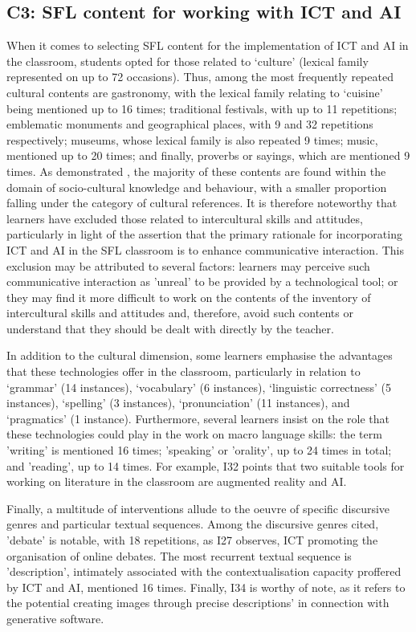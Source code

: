 \documentclass[english]{textolivre}
\begin{document}
\subsection{C3: SFL content for working with ICT and AI}
When it comes to selecting SFL content for the implementation of ICT and AI in the classroom, students opted for those related to ‘culture’ (lexical family represented on up to 72 occasions). Thus, among the most frequently repeated cultural contents are gastronomy, with the lexical family relating to ‘cuisine’ being mentioned up to 16 times; traditional festivals, with up to 11 repetitions; emblematic monuments and geographical places, with 9 and 32 repetitions respectively; museums, whose lexical family is also repeated 9 times; music, mentioned up to 20 times; and finally, proverbs or sayings, which are mentioned 9 times. As demonstrated \cite{cervantes2006}, the majority of these contents are found within the domain of socio-cultural knowledge and behaviour, with a smaller proportion falling under the category of cultural references. It is therefore noteworthy that learners have excluded those related to intercultural skills and attitudes, particularly in light of the assertion that the primary rationale for incorporating ICT and AI in the SFL classroom is to enhance communicative interaction. This exclusion may be attributed to several factors: learners may perceive such communicative interaction as 'unreal' to be provided by a technological tool; or they may find it more difficult to work on the contents of the inventory of intercultural skills and attitudes and, therefore, avoid such contents or understand that they should be dealt with directly by the teacher.

In addition to the cultural dimension, some learners emphasise the advantages that these technologies offer in the classroom, particularly in relation to ‘grammar’ (14 instances), ‘vocabulary’ (6 instances), ‘linguistic correctness’ (5 instances), ‘spelling’ (3 instances), ‘pronunciation’ (11 instances), and ‘pragmatics’ (1 instance). Furthermore, several learners insist on the role that these technologies could play in the work on macro language skills:  the term 'writing' is mentioned 16 times; 'speaking' or 'orality', up to 24 times in total; and 'reading', up to 14 times. For example, I32 points that two suitable tools for working on literature in the classroom are augmented reality and AI.

Finally, a multitude of interventions allude to the oeuvre of specific discursive genres and particular textual sequences. Among the discursive genres cited, 'debate' is notable, with 18 repetitions, as I27 observes, ICT promoting the organisation of online debates. The most recurrent textual sequence is 'description', intimately associated with the contextualisation capacity proffered by ICT and AI, mentioned 16 times. Finally, I34 is worthy of note, as it refers to the potential creating images through precise descriptions' in connection with generative software.
\end{document}
